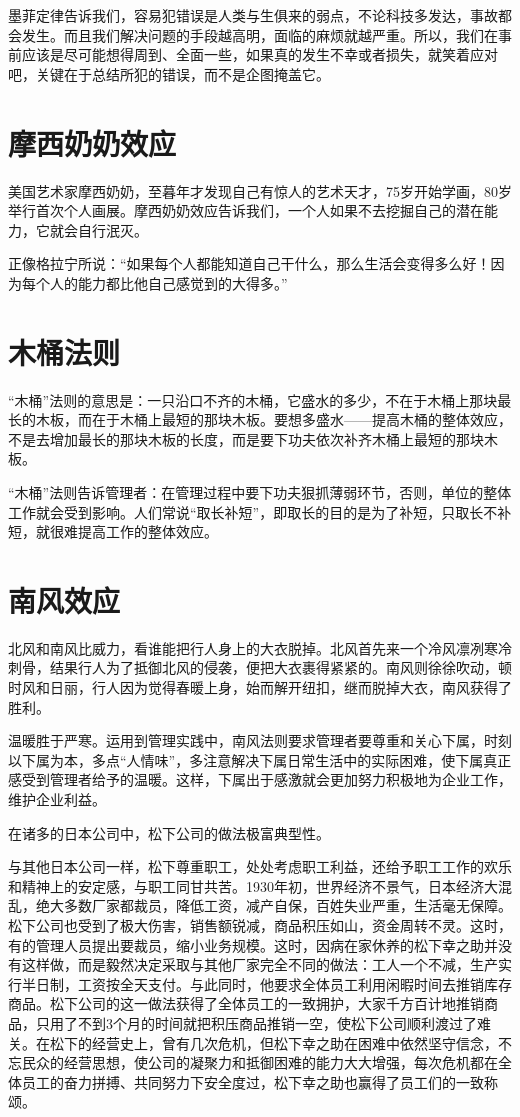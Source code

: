 \documentclass[11pt]{ctexart}
\begin{document}
墨菲定律告诉我们，容易犯错误是人类与生俱来的弱点，不论科技多发达，事故都会发生。而且我们解决问题的手段越高明，面临的麻烦就越严重。所以，我们在事前应该是尽可能想得周到、全面一些，如果真的发生不幸或者损失，就笑着应对吧，关键在于总结所犯的错误，而不是企图掩盖它。
\section{摩西奶奶效应}
\label{sec-70}


美国艺术家摩西奶奶，至暮年才发现自己有惊人的艺术天才，75岁开始学画，80岁举行首次个人画展。摩西奶奶效应告诉我们，一个人如果不去挖掘自己的潜在能力，它就会自行泯灭。

正像格拉宁所说：“如果每个人都能知道自己干什么，那么生活会变得多么好！因为每个人的能力都比他自己感觉到的大得多。”
\section{木桶法则}
\label{sec-71}


“木桶”法则的意思是：一只沿口不齐的木桶，它盛水的多少，不在于木桶上那块最长的木板，而在于木桶上最短的那块木板。要想多盛水——提高木桶的整体效应，不是去增加最长的那块木板的长度，而是要下功夫依次补齐木桶上最短的那块木板。

“木桶”法则告诉管理者：在管理过程中要下功夫狠抓薄弱环节，否则，单位的整体工作就会受到影响。人们常说“取长补短”，即取长的目的是为了补短，只取长不补短，就很难提高工作的整体效应。
\section{南风效应}
\label{sec-72}


北风和南风比威力，看谁能把行人身上的大衣脱掉。北风首先来一个冷风凛冽寒冷刺骨，结果行人为了抵御北风的侵袭，便把大衣裹得紧紧的。南风则徐徐吹动，顿时风和日丽，行人因为觉得春暖上身，始而解开纽扣，继而脱掉大衣，南风获得了胜利。

温暖胜于严寒。运用到管理实践中，南风法则要求管理者要尊重和关心下属，时刻以下属为本，多点“人情味”，多注意解决下属日常生活中的实际困难，使下属真正感受到管理者给予的温暖。这样，下属出于感激就会更加努力积极地为企业工作，维护企业利益。

在诸多的日本公司中，松下公司的做法极富典型性。

与其他日本公司一样，松下尊重职工，处处考虑职工利益，还给予职工工作的欢乐和精神上的安定感，与职工同甘共苦。1930年初，世界经济不景气，日本经济大混乱，绝大多数厂家都裁员，降低工资，减产自保，百姓失业严重，生活毫无保障。松下公司也受到了极大伤害，销售额锐减，商品积压如山，资金周转不灵。这时，有的管理人员提出要裁员，缩小业务规模。这时，因病在家休养的松下幸之助并没有这样做，而是毅然决定采取与其他厂家完全不同的做法：工人一个不减，生产实行半日制，工资按全天支付。与此同时，他要求全体员工利用闲暇时间去推销库存商品。松下公司的这一做法获得了全体员工的一致拥护，大家千方百计地推销商品，只用了不到3个月的时间就把积压商品推销一空，使松下公司顺利渡过了难关。在松下的经营史上，曾有几次危机，但松下幸之助在困难中依然坚守信念，不忘民众的经营思想，使公司的凝聚力和抵御困难的能力大大增强，每次危机都在全体员工的奋力拼搏、共同努力下安全度过，松下幸之助也赢得了员工们的一致称颂。
\end{document}
